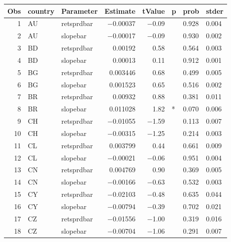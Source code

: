

\begin{longtable}{|r|l|l|r|r|l|l|l|}\hline
   Obs &    country &    Parameter &    Estimate &    tValue &    p &    prob &    stder\\\hline
\endhead
   1 &    AU &    retsprdbar &    $-$0.00037 &    $-$0.09 &      &    0.928 &    0.004\\\hline
   2 &    AU &    slopebar &    $-$0.00017 &    $-$0.09 &      &    0.930 &    0.002\\\hline
   3 &    BD &    retsprdbar &    0.00192 &    0.58 &      &    0.564 &    0.003\\\hline
   4 &    BD &    slopebar &    0.00013 &    0.11 &      &    0.912 &    0.001\\\hline
   5 &    BG &    retsprdbar &    0.003446 &    0.68 &      &    0.499 &    0.005\\\hline
   6 &    BG &    slopebar &    0.001523 &    0.65 &      &    0.516 &    0.002\\\hline
   7 &    BR &    retsprdbar &    0.00932 &    0.88 &      &    0.381 &    0.011\\\hline
   8 &    BR &    slopebar &    0.011028 &    1.82 &    * &    0.070 &    0.006\\\hline
   9 &    CH &    retsprdbar &    $-$0.01055 &    $-$1.59 &      &    0.113 &    0.007\\\hline
   10 &    CH &    slopebar &    $-$0.00315 &    $-$1.25 &      &    0.214 &    0.003\\\hline
   11 &    CL &    retsprdbar &    0.003799 &    0.44 &      &    0.661 &    0.009\\\hline
   12 &    CL &    slopebar &    $-$0.00021 &    $-$0.06 &      &    0.951 &    0.004\\\hline
   13 &    CN &    retsprdbar &    0.004769 &    0.90 &      &    0.369 &    0.005\\\hline
   14 &    CN &    slopebar &    $-$0.00166 &    $-$0.63 &      &    0.532 &    0.003\\\hline
   15 &    CY &    retsprdbar &    $-$0.02103 &    $-$0.48 &      &    0.635 &    0.044\\\hline
   16 &    CY &    slopebar &    $-$0.00794 &    $-$0.39 &      &    0.702 &    0.021\\\hline
   17 &    CZ &    retsprdbar &    $-$0.01556 &    $-$1.00 &      &    0.319 &    0.016\\\hline
   18 &    CZ &    slopebar &    $-$0.00704 &    $-$1.06 &      &    0.291 &    0.007\\\hline

\end{longtable}
